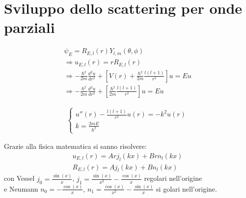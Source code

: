 \section{Sviluppo dello scattering per onde parziali} %


\begin{equation}\begin{split}
\psi _E=R_{E,l}\left(r\right)Y_{l,m}\left(\theta,\phi\right)\\
\Longrightarrow u_{E,l}\left(r\right)=rR_{E,l}\left(r\right)\\
\Longrightarrow -\frac{\hbar ^2}{2m}\frac{d^2u}{dr^2}+\left[V\left(r\right)+\frac{\hbar ^2}{2m}\frac{l\left(l+1\right)}{r^2}\right]u=Eu\\
\Longrightarrow -\frac{\hbar ^2}{2m}\frac{d^2u}{dr^2}+\left[\frac{\hbar ^2}{2m}\frac{l\left(l+1\right)}{r^2}\right]u=Eu
\end{split}\end{equation}

\begin{equation}\begin{split}
\begin{cases}
u''\left(r\right)-\frac{l\left(l+1\right)}{r^2}u\left(r\right)=-k^2u\left(r\right)\\
k=\frac{2mE}{\hbar ^2}
\end{cases}
\end{split}\end{equation}

Grazie alla fisica matematica si sanno risolvere:
\begin{equation}\begin{split}
u_{E,l}\left(r\right)=Arj_l\left(kx\right)+Brn_l\left(kx\right)\\
R_{E,l}\left(r\right)=Aj_l\left(kx\right)+Bn_l\left(kx\right)
\end{split}\end{equation}
con Vessel $j_0=\frac{\sin{\left(x\right)}}{x}$, $j_1=\frac{\sin{\left(x\right)}}{x^2}-\frac{\cos{\left(x\right)}}{x}$ regolari nell'origine \\ e Neumann $n_0=-\frac{\cos{\left(x\right)}}{x}$, $n_1=\frac{\cos{\left(x\right)}}{x^2}-\frac{\sin{\left(x\right)}}{x}$ si golari nell'origine.

